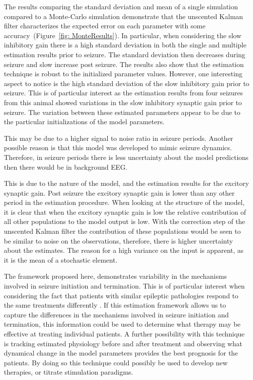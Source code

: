 The results comparing the standard deviation and mean of a single simulation compared to a Monte-Carlo simulation demonstrate that the unscented Kalman filter characterizes the expected error on each parameter with some accuracy~(Figure~\ref{fig: MonteResults}). In particular, when considering the slow inhibitory gain there is a high standard deviation in both the single and multiple estimation results prior to seizure. The standard deviation then decreases during seizure and slow increase post seizure. The results also show that the estimation technique is robust to the initialized parameter values. However, one interesting aspect to notice is the high standard deviation of the slow inhibitory gain prior to seizure. This is of particular interest as the estimation results from four seizures from this animal showed variations in the slow inhibitory synaptic gain prior to seizure. The variation between these estimated parameters appear to be due to the particular initializations of the model parameters.

This may be due to a higher signal to noise ratio in seizure periods. Another possible reason is that this model was developed to mimic seizure dynamics. Therefore, in seizure periods there is less uncertainty about the model predictions then there would be in background EEG.

 This is due to the nature of the model, and the estimation results for the excitory synaptic gain. Post seizure the excitory synaptic gain is lower than any other period in the estimation procedure. When looking at the structure of the model, it is clear that when the excitory synaptic gain is low the relative contribution of all other populations to the model output is low. With the correction step of the unscented Kalman filter the contribution of these populations would be seen to be similar to noise on the observations, therefore, there is higher uncertainty about the estimates. The reason for a high variance on the input is apparent, as it is the mean of a stochastic element. 


The framework proposed here, demonstrates variability in the mechanisms involved in seizure initiation and termination. This is of particular interest when considering the fact that patients with similar epileptic pathologies respond to the same treatments differently . If this estimation framework allows us to capture the differences in the mechanisms involved in seizure initiation and termination, this information could be used to determine what therapy may be effective at treating individual patients. A further possibility with this technique is tracking estimated physiology before and after treatment and observing what dynamical change in the model parameters provides the best prognosis for the patients. By doing so this technique could possibly be used to develop new therapies, or titrate stimulation paradigms.

